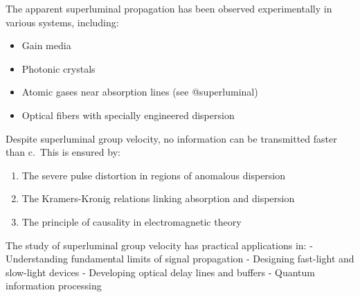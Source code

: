 \documentclass[
  a4paper,
]{book}
\providecommand{\tightlist}{%
  \setlength{\itemsep}{0pt}\setlength{\parskip}{0pt}}
\begin{document}
\begin{tcolorbox}[enhanced jigsaw, coltitle=black, title=\textcolor{quarto-callout-note-color}{\faInfo}\hspace{0.5em}{Note}, colframe=quarto-callout-note-color-frame, toprule=.15mm, opacitybacktitle=0.6, left=2mm, opacityback=0, breakable, toptitle=1mm, bottomtitle=1mm, leftrule=.75mm, arc=.35mm, titlerule=0mm, colbacktitle=quarto-callout-note-color!10!white, rightrule=.15mm, bottomrule=.15mm, colback=white]

The apparent superluminal propagation has been observed experimentally
in various systems, including:

\begin{itemize}
\tightlist
\item
  Gain media
\item
  Photonic crystals
\item
  Atomic gases near absorption lines (see @superluminal)
\item
  Optical fibers with specially engineered dispersion
\end{itemize}

\end{tcolorbox}

\begin{tcolorbox}[enhanced jigsaw, coltitle=black, title=\textcolor{quarto-callout-important-color}{\faExclamation}\hspace{0.5em}{Important}, colframe=quarto-callout-important-color-frame, toprule=.15mm, opacitybacktitle=0.6, left=2mm, opacityback=0, breakable, toptitle=1mm, bottomtitle=1mm, leftrule=.75mm, arc=.35mm, titlerule=0mm, colbacktitle=quarto-callout-important-color!10!white, rightrule=.15mm, bottomrule=.15mm, colback=white]

Despite superluminal group velocity, no information can be transmitted
faster than c.~This is ensured by:

\begin{enumerate}
\def\labelenumi{\arabic{enumi}.}
\tightlist
\item
  The severe pulse distortion in regions of anomalous dispersion
\item
  The Kramers-Kronig relations linking absorption and dispersion
\item
  The principle of causality in electromagnetic theory
\end{enumerate}

\end{tcolorbox}

The study of superluminal group velocity has practical applications in:
- Understanding fundamental limits of signal propagation - Designing
fast-light and slow-light devices - Developing optical delay lines and
buffers - Quantum information processing
\end{document}
